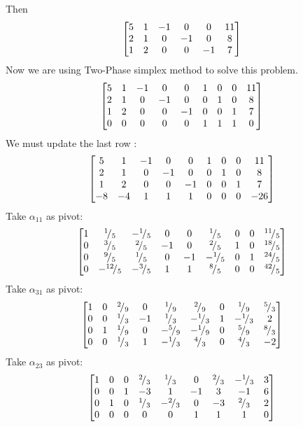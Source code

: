 \documentclass{article}
\newcommand*\rfrac[2]{{}^{#1}\!/_{#2}}
\begin{document}
Then \\
\begin{align*} 
\begin{bmatrix} 5 & 1 & -1 & 0 & 0  & 11 \\ 2 & 1 & 0 & -1 & 0 & 8 \\ 1 & 2 &  0 & 0 & -1 & 7  \end{bmatrix} 
\end{align*} 
Now we are using Two-Phase simplex method to solve this problem. \\
\begin{align*}
\begin{bmatrix} 5 & 1 & -1 & 0 & 0 & 1 & 0 & 0 & 11 \\ 2 & 1 & 0 & -1 & 0 & 0 & 1 & 0 & 8 \\ 1 & 2 & 0 & 0 & -1 & 0 & 0 & 1 & 7\\ 0 & 0 & 0 & 0 & 0 & 1 & 1 & 1 & 0  \end{bmatrix}
 \end{align*}
We must update the last row : \\
\begin{align*}
\begin{bmatrix} 5 & 1 & -1 & 0 & 0 & 1 & 0 & 0 & 11 \\ 2 & 1 & 0 & -1 & 0 & 0 & 1 & 0 & 8 \\ 1 & 2 & 0 & 0 & -1 & 0 & 0 & 1 & 7\\ -8 & -4 & 1 & 1 & 1 & 0 & 0 & 0 & -26  \end{bmatrix}
\end{align*}
Take $\alpha_{11} $ as pivot: 
\begin{align*}
\bmat{1 & \rfrac{1}{5} & -\rfrac{1}{5} & 0 & 0 &  \rfrac{1}{5} & 0 & 0 & \rfrac{11}{5} \\
0 & \rfrac{3}{5} & \rfrac{2}{5} & -1 & 0 & \rfrac{2}{5} & 1 & 0 & \rfrac{18}{5} \\
0 & \rfrac{9}{5} & \rfrac{1}{5} & 0 & -1 & -\rfrac{1}{5} & 0 & 1 & \rfrac{24}{5} \\
0 & -\rfrac{12}{5} & -\rfrac{3}{5} &  1 & 1 & \rfrac{8}{5} & 0 & 0 & \rfrac{42}{5} \\} 
\end{align*}
Take $\alpha_{31} $ as pivot: 
\begin{align*} 
\bmat{1 & 0 & \rfrac{2}{9} & 0 & \rfrac{1}{9} & \rfrac{2}{9} & 0 & \rfrac{1}{9} & \rfrac{5}{3} \\
0 & 0 & \rfrac{1}{3} & -1 & \rfrac{1}{3} & -\rfrac{1}{3} &  1 & -\rfrac{1}{3} & 2 \\
0 & 1 & \rfrac{1}{9} & 0 & -\rfrac{5}{9} & -\rfrac{1}{9} & 0 & \rfrac{5}{9} & \rfrac{8}{3} \\
0 & 0 & \rfrac{1}{3} & 1 & -\rfrac{1}{3} & \rfrac{4}{3} & 0 & \rfrac{4}{3} & -2} 
\end{align*}
Take $\alpha_{23}$ as pivot: 
\begin{align*} 
\bmat{1 & 0 & 0 & \rfrac{2}{3} & \rfrac{1}{3} & 0 & \rfrac{2}{3} & -\rfrac{1}{3} & 3 \\
0 & 0 & 1 & -3 & 1 & -1 & 3 & -1 & 6 \\
0 & 1 & 0 & \rfrac{1}{3} & -\rfrac{2}{3} & 0 & -3 & \rfrac{2}{3} & 2 \\
0 & 0 & 0 & 0 & 0 & 1 & 1 & 1 & 0} 
\end{align*} 
\end{document}
